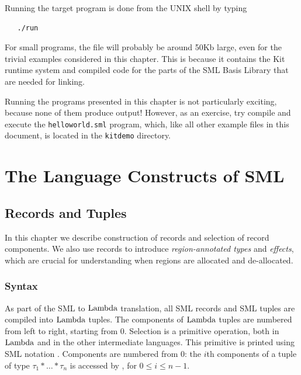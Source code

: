 \documentclass[12pt]{book}
\begin{document}
Running the target program is done from the UNIX shell by typing
%
\begin{verbatim}
   ./run
\end{verbatim}
For small programs, the file will probably be around 50Kb large, even
for the trivial examples considered in this chapter.  This is because
it contains the Kit runtime system and compiled code for the parts of
the SML Basis Library that are needed for linking.

Running the programs presented in this chapter is not particularly
exciting, because none of them produce output! However, as an
exercise, try compile and execute the 
%
{\tt helloworld.sml} program, which, like all other example files in
this document, is located in the
%
{\tt kitdemo} directory.


\part{The Language Constructs of SML}
\label{understanding.sec}

\chapter{Records and Tuples}
\label{records.sec}
In this chapter we describe construction of 
%
records and selection of record components. We also use records to
introduce 
%
{\em region-annotated types} and 
%
{\em effects}, which are crucial for understanding when regions are
allocated and de-allocated.

\section{Syntax}
As part of the SML to 
%
$\hbox{\rm Lambda}$ translation, all SML records and SML tuples are compiled into
$\hbox{\rm Lambda}$ tuples. The components of $\hbox{\rm Lambda}$ tuples are numbered from left
to right, starting from 0.  Selection is a primitive operation, both
in $\hbox{\rm Lambda}$ and in the other intermediate languages. This primitive is
printed using SML notation . Components are numbered from
0: the $i$th components of a tuple of type
$\tau_1\ast\ldots\ast\tau_n$ is accessed by , for $0\leq
i\leq n-1$.
\end{document}
